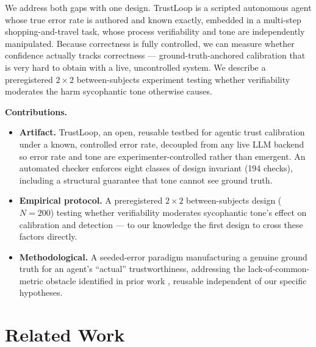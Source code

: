 \documentclass[manuscript]{acmart}
\begin{document}
We address both gaps with one design. TrustLoop is a scripted autonomous agent whose true error rate is authored and known exactly, embedded in a multi-step shopping-and-travel task, whose process verifiability and tone are independently manipulated. Because correctness is fully controlled, we can measure whether confidence actually tracks correctness --- ground-truth-anchored calibration that is very hard to obtain with a live, uncontrolled system. We describe a preregistered $2\times2$ between-subjects experiment testing whether verifiability moderates the harm sycophantic tone otherwise causes.

\smallskip\noindent\textbf{Contributions.}
\begin{itemize}[leftmargin=*, itemsep=2pt, topsep=2pt]
  \item \textbf{Artifact.} TrustLoop, an open, reusable testbed for agentic trust calibration under a known, controlled error rate, decoupled from any live LLM backend so error rate and tone are experimenter-controlled rather than emergent. An automated checker enforces eight classes of design invariant (194 checks), including a structural guarantee that tone cannot see ground truth.
  \item \textbf{Empirical protocol.} A preregistered $2\times2$ between-subjects design ($N{=}200$) testing whether verifiability moderates sycophantic tone's effect on calibration and detection --- to our knowledge the first design to cross these factors directly.
  \item \textbf{Methodological.} A seeded-error paradigm manufacturing a genuine ground truth for an agent's ``actual'' trustworthiness, addressing the lack-of-common-metric obstacle identified in prior work \cite{delibtrust2026}, reusable independent of our specific hypotheses.
\end{itemize}

\section{Related Work}
\end{document}
